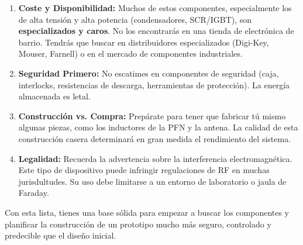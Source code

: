 \documentclass[11pt, a4paper]{article}
\begin{document}
\begin{enumerate}
    \item \textbf{Coste y Disponibilidad:} Muchos de estos componentes, especialmente los de alta tensión y alta potencia (condensadores, SCR/IGBT), son \textbf{especializados y caros}. No los encontrarás en una tienda de electrónica de barrio. Tendrás que buscar en distribuidores especializados (Digi-Key, Mouser, Farnell) o en el mercado de componentes industriales.
    \item \textbf{Seguridad Primero:} No escatimes en componentes de seguridad (caja, interlocks, resistencias de descarga, herramientas de protección). La energía almacenada es letal.
    \item \textbf{Construcción vs. Compra:} Prepárate para tener que fabricar tú mismo algunas piezas, como los inductores de la PFN y la antena. La calidad de esta construcción casera determinará en gran medida el rendimiento del sistema.
    \item \textbf{Legalidad:} Recuerda la advertencia sobre la interferencia electromagnética. Este tipo de dispositivo puede infringir regulaciones de RF en muchas jurisdultudes. Su uso debe limitarse a un entorno de laboratorio o jaula de Faraday.
\end{enumerate}

Con esta lista, tienes una base sólida para empezar a buscar los componentes y planificar la construcción de un prototipo mucho más seguro, controlado y predecible que el diseño inicial.
\end{document}
